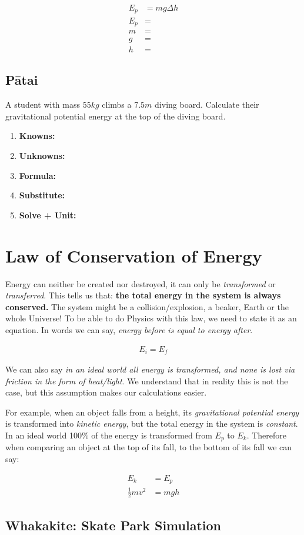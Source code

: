 \documentclass{report}
\newcommand\kufss{
	\begin{enumerate}[itemsep=15pt,label=,leftmargin=0.5cm]
		\item \textbf{Knowns:}
		\item \textbf{Unknowns:}
		\item \textbf{Formula:}
		\item \textbf{Substitute:}
		\item \textbf{Solve + Unit:}
	\end{enumerate}
}
\begin{document}
\begin{align*}
    E_{p} &= mg \Delta h \\
    E_{p} &= \\
    m &= \\
    g &= \\
	h &= 
\end{align*}

\subsection{Pātai}
A student with mass $55kg$ climbs a $7.5m$ diving board. Calculate their gravitational potential energy at the top of the diving board.
\kufss

\section{Law of Conservation of Energy}

Energy can neither be created nor destroyed, it can only be \textit{transformed} or \textit{transferred}. This tells us that: \textbf{the total energy in the system is always conserved.} The system might be a collision/explosion, a beaker, Earth or the whole Universe!
To be able to do Physics with this law, we need to state it as an equation. In words we can say, \textit{energy before is equal to energy after}.

\begin{align*}
	E_{i} = E_{f}
\end{align*}

We can also say \textit{in an ideal world all energy is transformed, and none is lost via friction in the form of heat/light}. We understand that in reality this is not the case, but this assumption makes our calculations easier.

For example, when an object falls from a height, its \textit{gravitational potential energy} is transformed into \textit{kinetic energy}, but the total energy in the system is \textit{constant}. In an ideal world 100\% of the energy is transformed from $E_{p}$ to $E_{k}$. Therefore when comparing an object at the top of its fall, to the bottom of its fall we can say:

\begin{align*}
	E_{k} &= E_{p} \\
	\frac{1}{2}mv^{2} &= mgh
\end{align*}

\subsection{Whakakite: Skate Park Simulation}
\end{document}
